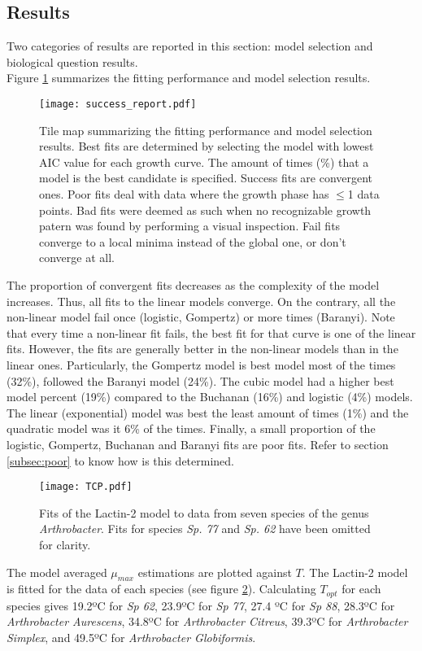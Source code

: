 \documentclass[titlepage,11pt]{article}
\begin{document}
\begin{linenumbers}
		\section{Results}
		Two categories of results are reported in this section: model selection and biological question results. \\
		Figure \ref{fig:success_report} summarizes the fitting performance and model selection results.
		\begin{figure}[h!]
			\texttt{[image: success\_report.pdf]}
			\centering
			\caption{Tile map summarizing the fitting performance and model selection results. Best fits are determined by selecting the model with lowest AIC value for each growth curve. The amount of times (\%) that a model is the best candidate is specified. Success fits are convergent ones. Poor fits deal with data where the growth phase has $ \leq $1 data points. Bad fits were deemed as such when no recognizable growth patern was found by performing a visual inspection. Fail fits converge to a local minima instead of the global one, or don't converge at all.}
			\label{fig:success_report}
		\end{figure}
		The proportion of convergent fits decreases as the complexity of the model increases. Thus, all fits to the linear models converge. On the contrary, all the non-linear model fail once (logistic, Gompertz) or more times (Baranyi). Note that every time a non-linear fit fails, the best fit for that curve is one of the linear fits. However, the fits are generally better in the non-linear models than in the linear ones. Particularly, the Gompertz model is best model most of the times (32\%), followed the Baranyi model (24\%). The cubic model had a higher best model percent (19\%) compared to the Buchanan (16\%) and logistic (4\%) models. The linear (exponential) model was best the least amount of times (1\%) and the quadratic model was it 6\% of the times. Finally, a small proportion of the logistic, Gompertz, Buchanan and Baranyi fits are poor fits. Refer to section \ref{subsec:poor} to know how is this determined.\\
		\begin{figure}[h]
			\texttt{[image: TCP.pdf]}
			\centering
			\caption{Fits of the Lactin-2 model to data from seven species of the genus \textit{Arthrobacter}. Fits for species \textit{Sp. 77} and \textit{Sp. 62} have been omitted for clarity.}
			\label{fig:TCP}
		\end{figure}
		The model averaged $ \mu_{max} $  estimations are plotted against $ T $. The Lactin-2 model is fitted for the data of each species (see figure \ref{fig:TCP}). Calculating $ T_{opt} $ for each species gives 19.2ºC for \textit{Sp 62}, 23.9ºC for \textit{Sp 77}, 27.4 ºC for \textit{Sp 88}, 28.3ºC for \textit{Arthrobacter Aurescens}, 34.8ºC for \textit{Arthrobacter Citreus}, 39.3ºC for \textit{Arthrobacter Simplex}, and 49.5ºC for \textit{Arthrobacter Globiformis}. 

\end{linenumbers}
\end{document}
